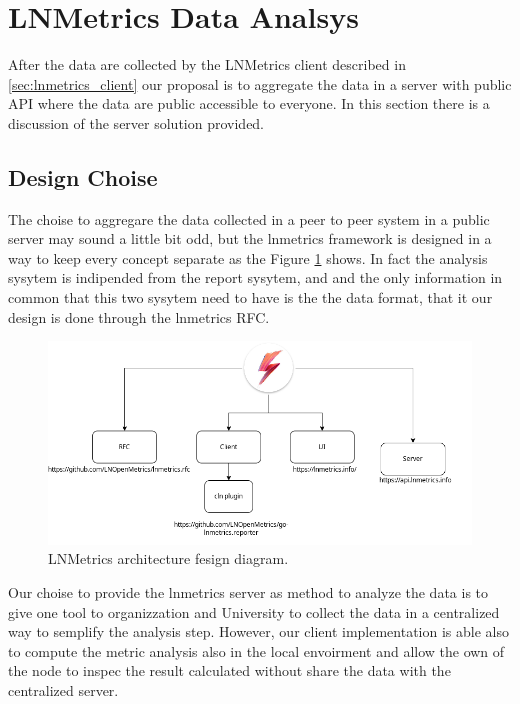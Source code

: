 \section{LNMetrics Data Analsys}
\label{sec:lnmetrics_server}

After the data are collected by the LNMetrics client described in \ref{sec:lnmetrics_client}
our proposal is to aggregate the data in a server with public API where the data are 
public accessible to everyone. In this section there is a discussion of 
the server solution provided.

\subsection{Design Choise}

The choise to aggregare the data collected in a peer to peer system in a public 
server may sound a little bit odd, but the lnmetrics framework is designed in a 
way to keep every concept separate as the Figure \ref{fig:lnmetrics_architecture} 
shows. In fact the analysis sysytem is indipended from the report sysytem, and 
and the only information in common that this two sysytem need to have is the 
the data format, that it our design is done through the lnmetrics RFC.

\begin{figure}
    \begin{center}
    \includegraphics[scale=0.5]{imgs/lnmetrics-architecture.drawio.png}
    \end{center}
    \caption{LNMetrics architecture fesign diagram.}
    \label{fig:lnmetrics_architecture}
\end{figure}

Our choise to provide the lnmetrics server as method to analyze the data is to 
give one tool to organizzation and University to collect the data in a centralized
way to semplify the analysis step. However, our client implementation is able also
to compute the metric analysis also in the local envoirment and allow the own
of the node to inspec the result calculated without share the data with the centralized
server.


